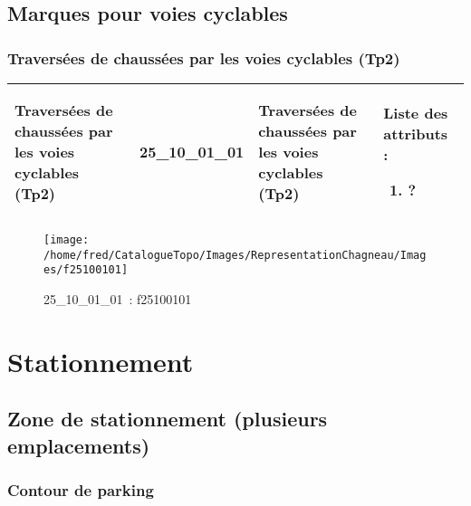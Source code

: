 \documentclass[12pt,titlepage]{book}
\begin{document}
\section{\large Marques pour voies cyclables}
\subsection{Traversées de chaussées par les voies cyclables (Tp2)}
\noindent
\vspace{\baselineskip}

\renewcommand{\arraystretch}{1.2}
\begin{supertabular}{|p{10cm}|c|p{13cm}|p{12cm}|}
 Traversées de chaussées par les voies cyclables (Tp2) & 25\_10\_01\_01 & Traversées de chaussées par les voies cyclables (Tp2) & Liste des attributs :
\begin{enumerate}
  \item ?\end{enumerate}
\\
\hline
\end{supertabular}
\begin{figure}[h!]
  \hfill         %
  \begin{minipage}[t]{3cm}
    \begin{center}
      \texttt{[image: /home/fred/CatalogueTopo/Images/RepresentationChagneau/Images/f25100101]}
      \caption[~25\_10\_01\_01]{\small{25\_10\_01\_01~:} \tiny{f25100101}}\label{f25100101}
    \end{center}
  \end{minipage}
\end{figure}
\chapter{Stationnement}
\section{\large Zone de stationnement (plusieurs emplacements)}
\subsection{Contour de parking}
\noindent
\vspace{\baselineskip}
\end{document}
